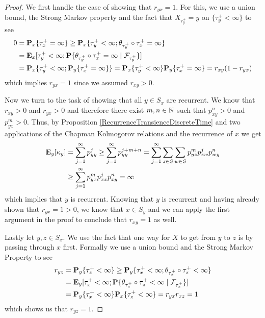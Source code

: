\begin{proof}
We first handle the case of showing that $r_{yx} = 1$.  For this, we
use a union bound, the Strong Markov property and the fact that
$X_{\tau^+_y} = y$ on $\lbrace \tau^+_y < \infty \rbrace$ to see
\begin{align*}
0 &= \sprobability{\tau^+_x = \infty} {x} 
\geq \sprobability{\tau^+_y < \infty ; \theta_{\tau^+_y} \circ
  \tau^+_x = \infty} {x} \\
&= \sexpectation{\tau^+_y < \infty ; \cprobability {\mathcal{F}_{\tau^+_y}}{\theta_{\tau^+_y} \circ
  \tau^+_x = \infty} } {x} \\
&=\sprobability{\tau^+_y < \infty ; \sprobability{\tau^+_x = \infty}
  {y}} {x} = \sprobability{\tau^+_y < \infty } {x}
\sprobability{\tau^+_x = \infty}{y} = r_{xy}(1 -r_{yx})
\end{align*}
which implies $r_{yx} =1$ since we assumed $r_{xy} > 0$.

Now we turn to the task of showing that all $y \in S_x$ are recurrent.
We know that $r_{xy} > 0$ and $r_{yx} > 0$ and therefore there exist
$m, n \in \naturals$ such that $p^n_{xy} > 0$ and $p^m_{yx} > 0$.
Thus, by Proposition \ref{RecurrenceTransienceDiscreteTime} and two
applications of the 
Chapman Kolmogorov relations and the recurrence of $x$  we get
\begin{align*}
\sexpectation{\kappa_y}{y} &= \sum_{j=1}^\infty p^j_{yy} \geq
\sum_{j=1}^\infty p^{j+m+n}_{yy} =\sum_{j=1}^\infty \sum_{z \in S} \sum_{w \in S} p^m_{yz}p^j_{zw}
p^n_{wy} \\
&\geq \sum_{j=1}^\infty p^m_{yx}p^j_{xx}
p^n_{xy} =\infty
\end{align*}
which implies that $y$ is recurrent.  Knowing that $y$ is recurrent
and having already shown that $r_{yx} =1 >0$, we know that $x \in S_y$
and we can apply the first
argument in the proof to conclude that $r_{xy} =1$ as well.

Lastly let $y,z \in S_x$.  We use the fact that one way for $X$ to get
from $y$ to $z$ is by passing through $x$ first.  Formally we use a
union bound and the Strong Markov Property to see
\begin{align*}
r_{yz} &= \sprobability{\tau^+_z < \infty}{y} \geq
\sprobability{\tau^+_x < \infty ; \theta_{\tau^+_x} \circ \tau^+_z < \infty}{y}
\\
&=\sexpectation{\tau^+_x < \infty ;
  \cprobability{\mathcal{F}_{\tau^+_x}}{\theta_{\tau^+_x} \circ
    \tau^+_z < \infty}}{y} \\
&= \sprobability{\tau^+_x < \infty }{y}
\sprobability{\tau^+_z < \infty}{x} = r_{yx} r_{xz} = 1
\end{align*}
which shows us that $r_{yz} = 1$.
\end{proof}

